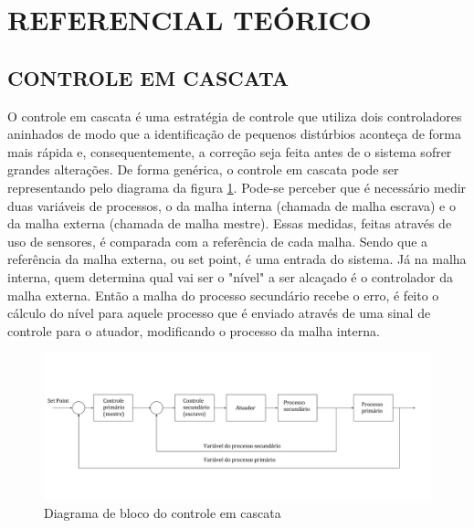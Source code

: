 \documentclass[a4paper,12pt]{article}
\begin{document}

\newpage


\thispagestyle{main}

\section{REFERENCIAL TEÓRICO}

\subsection{CONTROLE EM CASCATA}
\hspace{4ex}O controle em cascata é uma estratégia de controle que utiliza dois controladores aninhados de modo que a identificação de pequenos distúrbios aconteça de forma mais rápida e, consequentemente, a correção seja feita antes de o sistema sofrer grandes alterações. De forma genérica, o controle em cascata pode ser representando pelo diagrama da figura \ref{cascata}. Pode-se perceber que é necessário medir duas variáveis de processos, o da malha interna (chamada de malha escrava) e o da malha externa (chamada de malha mestre). Essas medidas, feitas através de uso de sensores, é comparada com a referência de cada malha. Sendo que a referência da malha externa, ou set point, é uma entrada do sistema. Já na malha interna, quem determina qual vai ser o "nível" a ser alcaçado é o controlador da malha externa. Então a malha do processo secundário recebe o erro, é feito o cálculo do nível para aquele processo que é enviado através de uma sinal de controle para o atuador, modificando o processo da malha interna.     

\begin{figure}[h]
\centering
\includegraphics[width=17cm]{ImagensLab4/controle-em-cascata.png}
\caption{Diagrama de bloco do controle em cascata}
\label{cascata}
\end{figure}
\end{document}
